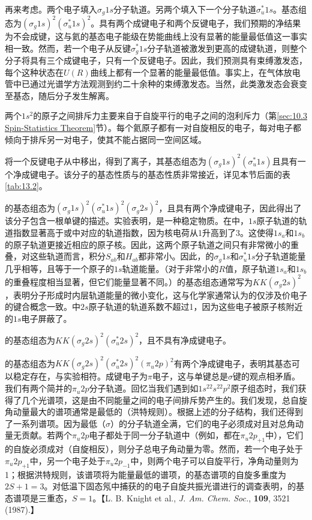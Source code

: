     再来考虑。两个电子填入$\sigma_g1s$分子轨道。另两个填入下一个分子轨道$\sigma_u^*1s$。基态组态为$\left(\sigma_g1s\right)^2\left(\sigma_u^*1s\right)^2$。具有两个成键电子和两个反键电子，我们预期的净结果为不会成键，这与氦的基态电子能级在势能曲线上没有显著的能量最低值这一事实相一致。然而，若一个电子从反键$\sigma_g^*1s$分子轨道被激发到更高的成键轨道，则整个分子将具有三个成键电子，只有一个反键电子。因此，我们预测具有束缚激发态，每个这种状态在$U\left(R\right)$曲线上都有一个显著的能量最低值。事实上，在气体放电管中已通过光谱学方法观测到约二十余种的束缚激发态。当然，此类激发态会衰变至基态，随后分子发生解离。

    两个$1s^2$的原子之间排斥力主要来自于自旋平行的电子之间的泡利斥力（第\ref{sec:10.3 Spin-Statistics Theorem}节）。每个氦原子都有一对自旋相反的电子，每对电子都倾向于排斥另一对电子，使其不能占据同一空间区域。

    将一个反键电子从中移出，得到了离子，其基态组态为$\left(\sigma_g1s\right)^2\left(\sigma_u^*1s\right)$且具有一个净成键电子。该分子的基态性质与的基态性质非常接近，详见本节后面的表\ref{tab:13.2}。

    的基态组态为$\left(\sigma_g1s\right)^2\left(\sigma_u^*1s\right)^2\left(\sigma_g2s\right)^2$，且具有两个净成键电子，因此得出了该分子包含一根单键的描述。实验表明，是一种稳定物质。在中，$1s$原子轨道的轨道指数显著高于或中对应的轨道指数，因为核电荷从1升高到了3。这使得$1s_a$和$1s_b$的原子轨道更接近相应的原子核。因此，这两个原子轨道之间只有非常微小的重叠，对这些轨道而言，积分$S_{ab}$和$H_{ab}$都非常小。因此，的$\sigma_g1s$和$\sigma_u^*1s$分子轨道能量几乎相等，且等于一个原子的$1s$轨道能量。（对于非常小的$R$值，原子轨道$1s_a$和$1s_b$的重叠程度相当显著，但它们能量显著不同。）的基态组态通常写为$KK\left(\sigma_g2s\right)^2$，表明分子形成时内层轨道能量的微小变化，这与化学家通常认为的仅涉及价电子的键合概念一致。中$2s$原子轨道的轨道系数不超过1，因为这些电子被原子核附近的$1s$电子屏蔽了。

    的基态组态为$KK\left(\sigma_g2s\right)^2\left(\sigma_u^*2s\right)^2$，且不具有净成键电子。

    的基态组态为$KK\left(\sigma_g2s\right)^2\left(\sigma_u^*2s\right)^2\left(\pi_u2p\right)^2$有两个净成键电子，表明其基态可以稳定存在，与实验相符。成键电子为$\pi$电子，这与单键总是$\sigma$键的观点相矛盾。我们有两个简并的$\pi_u2p$分子轨道。回忆当我们遇到如$1s^22s^22p^2$原子组态时，我们获得了几个光谱项，这是由不同能量之间的电子间排斥势产生的。我们发现，总自旋角动量最大的谱项通常是最低的（洪特规则）。根据上述的分子结构，我们还得到了一系列谱项。因为最低（$\sigma$）的分子轨道全满，它们的电子必须成对且对总角动量无贡献。若两个$\pi_u2p$电子都处于同一分子轨道中（例如，都在$\pi_u2p_{+1}$中），它们的自旋必须成对（自旋相反），则分子总电子角动量为零。然而，若一个电子处于$\pi_u2p_{+1}$中，另一个电子处于$\pi_u2p_{-1}$中，则两个电子可以自旋平行，净角动量则为1；根据洪特规则，该谱项将为能量最低的谱项，的基态谱项的自旋多重度为$2S+1=3$。对低温下固态氖中捕获的的电子自旋共振光谱进行的调查表明，的基态谱项是三重态，$S=1$。【L. B. Knight et al., \textit{J. Am. Chem. Soc.}, \textbf{109}, 3521 (1987).】

